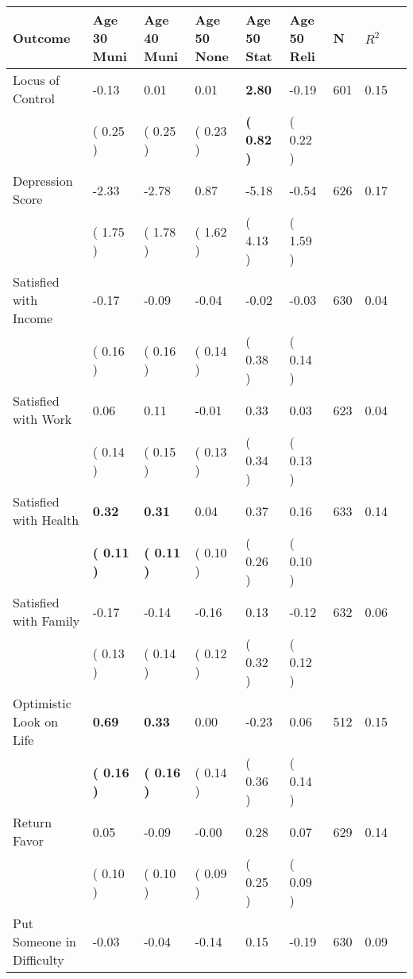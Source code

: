 \begin{tabular}{L{6.2cm} C{1.8cm} C{1.8cm} C{1.8cm} C{1.8cm} C{1.8cm} C{1.8cm} C{0.3cm} C{0.3cm}}
\toprule
 \textbf{Outcome} & \textbf{Age 30 Muni} & \textbf{Age 40 Muni} & \textbf{Age 50 None} & \textbf{Age 50 Stat} & \textbf{Age 50 Reli} & \textbf{N} & \textbf{$ R^2$} \\
\midrule
Locus of Control &     -0.13 &      0.01 &      0.01 & \textbf{     2.80} &     -0.19  & 601 &       0.15 \\ 
 & (     0.25 ) & (     0.25 ) & (     0.23 ) & \textbf{(     0.82 )} & (     0.22 )  & \\
Depression Score &     -2.33 &     -2.78 &      0.87 &     -5.18 &     -0.54  & 626 &       0.17 \\ 
 & (     1.75 ) & (     1.78 ) & (     1.62 ) & (     4.13 ) & (     1.59 )  & \\
Satisfied with Income &     -0.17 &     -0.09 &     -0.04 &     -0.02 &     -0.03  & 630 &       0.04 \\ 
 & (     0.16 ) & (     0.16 ) & (     0.14 ) & (     0.38 ) & (     0.14 )  & \\
Satisfied with Work &      0.06 &      0.11 &     -0.01 &      0.33 &      0.03  & 623 &       0.04 \\ 
 & (     0.14 ) & (     0.15 ) & (     0.13 ) & (     0.34 ) & (     0.13 )  & \\
Satisfied with Health & \textbf{     0.32} & \textbf{     0.31} &      0.04 &      0.37 &      0.16  & 633 &       0.14 \\ 
 & \textbf{(     0.11 )} & \textbf{(     0.11 )} & (     0.10 ) & (     0.26 ) & (     0.10 )  & \\
Satisfied with Family &     -0.17 &     -0.14 &     -0.16 &      0.13 &     -0.12  & 632 &       0.06 \\ 
 & (     0.13 ) & (     0.14 ) & (     0.12 ) & (     0.32 ) & (     0.12 )  & \\
Optimistic Look on Life & \textbf{     0.69} & \textbf{     0.33} &      0.00 &     -0.23 &      0.06  & 512 &       0.15 \\ 
 & \textbf{(     0.16 )} & \textbf{(     0.16 )} & (     0.14 ) & (     0.36 ) & (     0.14 )  & \\
Return Favor &      0.05 &     -0.09 &     -0.00 &      0.28 &      0.07  & 629 &       0.14 \\ 
 & (     0.10 ) & (     0.10 ) & (     0.09 ) & (     0.25 ) & (     0.09 )  & \\
Put Someone in Difficulty &     -0.03 &     -0.04 &     -0.14 &      0.15 &     -0.19  & 630 &       0.09 \\ 

\end{tabular}
